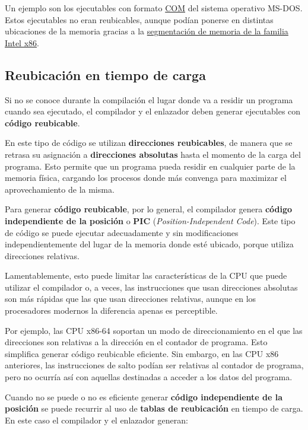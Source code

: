 Un ejemplo son los ejecutables con formato
\href{https://es.wikipedia.org/wiki/Archivo_COM}{COM} del sistema
operativo MS-DOS. Estos ejecutables no eran reubicables, aunque podían
ponerse en distintas ubicaciones de la memoria gracias a la
\href{https://es.wikipedia.org/wiki/Segmentaci\%C3\%B3n_de_memoria_del_x86}{segmentación
de memoria de la familia Intel x86}.

\subsection{Reubicación en tiempo de
carga}\label{_reubicaciuxf3n_en_tiempo_de_carga}

Si no se conoce durante la compilación el lugar donde va a residir un
programa cuando sea ejecutado, el compilador y el enlazador deben
generar ejecutables con \textbf{código reubicable}{}.

En este tipo de código se utilizan \textbf{direcciones reubicables}, de
manera que se retrasa su asignación a \textbf{direcciones absolutas}
hasta el momento de la carga del programa. Esto permite que un programa
pueda residir en cualquier parte de la memoria física, cargando los
procesos donde más convenga para maximizar el aprovechamiento de la
misma.

Para generar \textbf{código reubicable}, por lo general, el compilador
genera \textbf{código independiente de la posición}{} o \textbf{{}PIC}
(\emph{Position-Independent Code}). Este tipo de código se puede
ejecutar adecuadamente y sin modificaciones independientemente del lugar
de la memoria donde esté ubicado, porque utiliza direcciones relativas.

Lamentablemente, esto puede limitar las características de la CPU que
puede utilizar el compilador o, a veces, las instrucciones que usan
direcciones absolutas son más rápidas que las que usan direcciones
relativas, aunque en los procesadores modernos la diferencia apenas es
perceptible.

Por ejemplo, las CPU x86-64 soportan un modo de direccionamiento en el
que las direcciones son relativas a la dirección en el contador de
programa. Esto simplifica generar código reubicable eficiente. Sin
embargo, en las CPU x86 anteriores, las instrucciones de salto podían
ser relativas al contador de programa, pero no ocurría así con aquellas
destinadas a acceder a los datos del programa.

Cuando no se puede o no es eficiente generar \textbf{código
independiente de la posición} se puede recurrir al uso de \textbf{tablas
de reubicación} en tiempo de carga. En este caso el compilador y el
enlazador generan:

